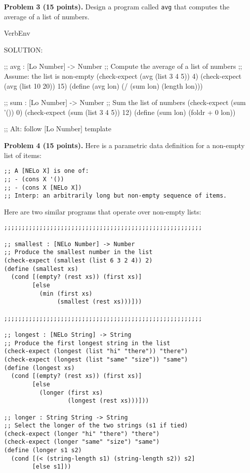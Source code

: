 \documentclass[12pt]{article}
\begin{document}


\newpage

\noindent
{\bf Problem 3 (15 points).}
%
Design a program called {\tt avg} that computes the average of a list of numbers.

\begin{SaveVerbatim}{VerbEnv}

SOLUTION:

;; avg : [Lo Number] -> Number
;; Compute the average of a list of numbers
;; Assume: the list is non-empty
(check-expect (avg (list 3 4 5)) 4)
(check-expect (avg (list 10 20)) 15)
(define (avg lon)
  (/ (sum lon) 
     (length lon)))

;; sum : [Lo Number] -> Number
;; Sum the list of numbers
(check-expect (sum '()) 0)
(check-expect (sum (list 3 4 5)) 12)
(define (sum lon)
  (foldr + 0 lon))

;; Alt: follow [Lo Number] template
\end{SaveVerbatim}



\newpage 
\noindent
{\bf Problem 4 (15 points).}
%
Here is a parametric data definition for a non-empty list of items:
\begin{verbatim}
;; A [NELo X] is one of:
;; - (cons X '())
;; - (cons X [NELo X])
;; Interp: an arbitrarily long but non-empty sequence of items.
\end{verbatim}
Here are two similar programs that operate over non-empty lists:
\begin{verbatim}
;;;;;;;;;;;;;;;;;;;;;;;;;;;;;;;;;;;;;;;;;;;;;;;;;;;;;;;;

;; smallest : [NELo Number] -> Number
;; Produce the smallest number in the list
(check-expect (smallest (list 6 3 2 4)) 2)
(define (smallest xs)
  (cond [(empty? (rest xs)) (first xs)]
        [else
          (min (first xs)
               (smallest (rest xs)))]))

;;;;;;;;;;;;;;;;;;;;;;;;;;;;;;;;;;;;;;;;;;;;;;;;;;;;;;;;

;; longest : [NELo String] -> String
;; Produce the first longest string in the list
(check-expect (longest (list "hi" "there")) "there")
(check-expect (longest (list "same" "size")) "same")
(define (longest xs)
  (cond [(empty? (rest xs)) (first xs)]
        [else
          (longer (first xs)
                  (longest (rest xs)))]))

;; longer : String String -> String
;; Select the longer of the two strings (s1 if tied)
(check-expect (longer "hi" "there") "there")
(check-expect (longer "same" "size") "same")
(define (longer s1 s2)
  (cond [(< (string-length s1) (string-length s2)) s2]
        [else s1]))
\end{verbatim}
\end{document}
